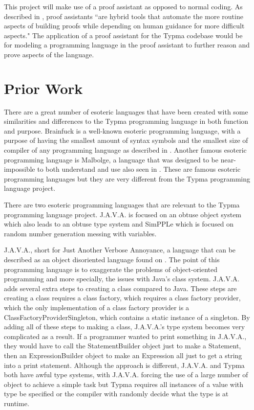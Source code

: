 \documentclass[10pt,twocolumn]{article}
\begin{document}
This project will make use of a proof assistant as opposed to normal coding. As described in \textcite{Pierce2021Software}, proof assistants ``are hybrid tools that automate the more routine aspects of building proofs while depending on human guidance for more difficult aspects." The application of a proof assistant for the Typma codebase would be for modeling a programming language in the proof assistant to further reason and prove aspects of the language.

\section{Prior Work}

There are a great number of esoteric languages that have been created with some similarities and differences to the Typma programming language in both function and purpose. Brainfuck is a well-known esoteric programming language, with a purpose of having the smallest amount of syntax symbols and the smallest size of compiler of any programming language as described in \textcite{Morr2014Esoteric}. Another famous esoteric programming language is Malbolge, a language that was designed to be near-impossible to both understand and use also seen in \textcite{Morr2014Esoteric}. These are famous esoteric programming languages but they are very different from the Typma programming language project.

There are two esoteric programming languages that are relevant to the Typma programming language project. J.A.V.A. is focused on an obtuse object system which also leads to an obtuse type system and SimPPLe which is focused on random number generation messing with variables.

J.A.V.A., short for Just Another Verbose Annoyance, a language that can be described as an object disoriented language found on \textcite{J.A.V.A.}. The point of this programming language is to exaggerate the problems of object-oriented programming and more specially, the issues with Java's class system. J.A.V.A. adds several extra steps to creating a class compared to Java. These steps are creating a class requires a class factory, which requires a class factory provider, which the only implementation of a class factory provider is a ClassFactoryProviderSingleton, which contains a static instance of a singleton. By adding all of these steps to making a class, J.A.V.A.'s type system becomes very complicated as a result. If a programmer wanted to print something in J.A.V.A., they would have to call the StatementBuilder object just to make a Statement, then an ExpressionBuilder object to make an Expression all just to get a string into a print statement. Although the approach is different, J.A.V.A. and Typma both have awful type systems, with J.A.V.A. forcing the use of a large number of object to achieve a simple task but Typma requires all instances of a value with type be specified or the compiler with randomly decide what the type is at runtime.
\end{document}
